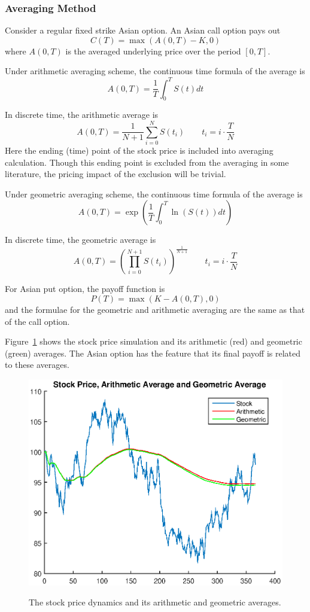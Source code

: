 \documentclass[a4paper,11pt] {article}
\begin{document}
\subsubsection{Averaging Method}
Consider a regular fixed strike Asian option. An Asian call option pays out
$$
C(T) = \max(A(0,T)-K,0)
$$
where $A(0,T)$ is the averaged underlying price over the period $[0,T]$.

Under arithmetic averaging scheme, the continuous time formula of the average is
$$
A(0,T) = \frac{1}{T} \int_0^T S(t)dt
$$

In discrete time, the arithmetic average is
$$
A(0,T) = \frac{1}{N+1} \sum_{i=0}^{N} S(t_i) \qquad t_i = i \cdot \frac{T}{N}
$$
Here the ending (time) point of the stock price is included into averaging calculation. Though this ending point is excluded from the averaging in some literature, the pricing impact of the exclusion will be trivial.

Under geometric averaging scheme, the continuous time formula of the average is
$$
A(0,T) = \exp\left(\frac{1}{T} \int_0^T \ln(S(t))dt\right)
$$

In discrete time, the geometric average is
$$
A(0,T) = \left( \prod_{i=0}^{N+1} S(t_i)  \right)^\frac{1}{N+1} \qquad t_i = i \cdot \frac{T}{N}
$$

For Asian put option, the payoff function is
$$
P(T) = \max(K-A(0,T),0)
$$
and the formulae for the geometric and arithmetic averaging are the same as that of the call option.

Figure~\ref{fig::geo_vs_arith} shows the stock price simulation and its arithmetic (red) and geometric (green) averages. The Asian option has the feature that its final payoff is related to these averages.

\begin{figure}
  \centering
  \includegraphics[scale=0.6]{geo_vs_arith.eps}\\
  \caption{The stock price dynamics and its arithmetic and geometric averages.}\label{fig::geo_vs_arith}
\end{figure}
\end{document}
